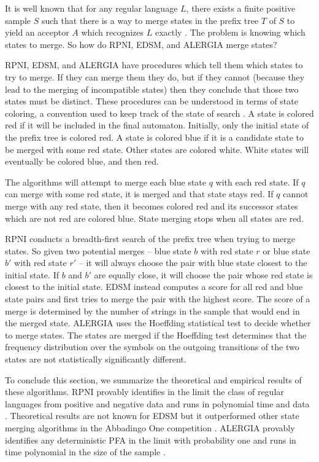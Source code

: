 \documentclass[twoside,11pt]{article}
\begin{document}
It is well known that for any regular language $L$, there exists a finite positive sample $S$ such that there is a way to merge states in the prefix tree $T$ of $S$ to yield an acceptor $A$ which recognizes $L$ exactly \citep[\S3.4.4]{Heinz-delaHiguera-vanZaanen-GICL}. The problem is knowing which states to merge. So how do RPNI, EDSM, and ALERGIA merge states?

RPNI, EDSM, and ALERGIA have procedures which tell them which states to try to merge.
If they can merge them they do, but if they cannot (because they lead to the merging of incompatible states) then they conclude that those two states must be distinct.
These procedures can be understood in terms of state coloring, a convention used to keep track of the state of search \citep{Higuera2010}.
A state is colored red if it will be included in the final automaton.
Initially, only the initial state of the prefix tree is colored red.
A state is colored blue if it is a candidate state to be merged with some red state.
Other states are colored white.
White states will eventually be colored blue, and then red.

The algorithms will attempt to merge each blue state $q$ with each red state.
If $q$ can merge with some red state, it is merged and that state stays red.
If $q$ cannot merge with any red state, then it becomes colored red and its successor states which are not red are colored blue.
State merging stops when all states are red.

RPNI conducts a breadth-first search of the prefix tree when trying to merge states. So given two potential merges -- blue state $b$ with red state $r$ or blue state $b'$ with red state $r'$ -- it will always choose the pair with blue state closest to the initial state.
If $b$ and $b'$ are equally close, it will choose the pair whose red state is closest to the initial state.
EDSM instead computes a score for all red and blue state pairs and first tries to merge the pair with the highest score.
The score of a merge is determined by the number of strings in the sample that would end in the merged state.
ALERGIA uses the Hoeffding statistical test to decide whether to merge states.  The states are merged if the Hoeffding test determines that the frequency distribution over the symbols on the outgoing transitions of the two states are not statistically significantly different.

To conclude this section, we summarize the theoretical and empirical results of these algorithms. RPNI provably identifies in the limit the class of regular languages from positive and negative data and runs in polynomial time and data \citep{rpni-1992}. Theoretical results are not known for EDSM but it outperformed other state merging algorithms in the Abbadingo One competition \citep{Lang1998}. ALERGIA provably identifies any deterministic PFA in the limit with probability one and runs in time polynomial in the size of the sample \citep{carr99,Higuera-Thollard-2000}.
\end{document}
